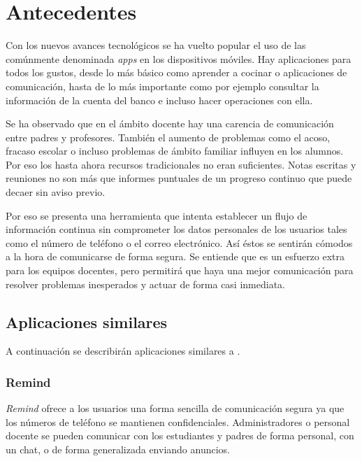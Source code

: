 %
%
%
%

\cleardoublepage
\chapter{Antecedentes}
\label{chap:record}

	Con los nuevos avances tecnológicos se ha vuelto popular el uso de las comúnmente denominada {\it apps} en los dispositivos móviles. Hay aplicaciones para todos los gustos, desde lo más básico como aprender a cocinar o aplicaciones de comunicación, hasta de lo más importante como por ejemplo consultar la información de la cuenta del banco e incluso hacer operaciones con ella.
	
	\bigskip
	Se ha observado que en el ámbito docente hay una carencia de comunicación entre padres y profesores. También el aumento de problemas como el acoso, fracaso escolar o incluso problemas de ámbito familiar influyen en los alumnos. Por eso los hasta ahora recursos tradicionales no eran suficientes. Notas escritas y reuniones no son más que informes puntuales de un progreso continuo que puede decaer sin aviso previo.
	
	\bigskip
	Por eso se presenta una herramienta que intenta establecer un flujo de información continua sin comprometer los datos personales de los usuarios tales como el número de teléfono o el correo electrónico. Así éstos se sentirán cómodos a la hora de comunicarse de forma segura. Se entiende que es un esfuerzo extra para los equipos docentes, pero permitirá que haya una mejor comunicación para resolver problemas inesperados y actuar de forma casi inmediata.
	
	\section{Aplicaciones similares}
	
	A continuación se describirán aplicaciones similares a \CollegeApp.
	
	\subsection{Remind}
	{\it Remind} \cite{3:remind:online} ofrece a los usuarios una forma sencilla de comunicación segura ya que los números de teléfono se mantienen confidenciales. Administradores o personal docente se pueden comunicar con los estudiantes y padres de forma personal, con un chat, o de forma generalizada enviando anuncios.
	
